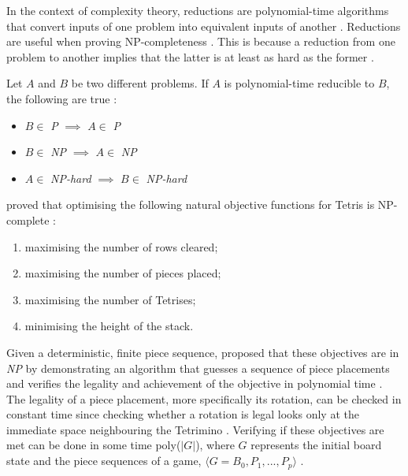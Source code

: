 \documentclass[a4paper, 12pt]{extreport}
\begin{document}
				In the context of complexity theory, reductions are polynomial-time algorithms that convert inputs of one problem into equivalent inputs of another \cite{npcompleteness}. Reductions are useful when proving NP-completeness \cite{cc:modern}. This is because a reduction from one problem to another implies that the latter is at least as hard as the former \cite{cc:modern}.
				
				Let $A$ and $B$ be two different problems. If $A$ is polynomial-time reducible to $B$, the following are true \cite{npcompleteness}:
				
				\begin{itemize}
					\item $B \in $ \textit{P} $\implies$ $A \in $ \textit{P}
					\item $B \in $ \textit{NP} $\implies$ $A \in $ \textit{NP}
					\item $A \in $ \textit{NP-hard} $\implies$ $B \in$ \textit{NP-hard}
				\end{itemize}
				
				\citeauthor{tetris-is-hard-even-to-approx} proved that optimising the following natural objective functions for Tetris is NP-complete \cite{tetris-is-hard-even-to-approx}:
				
				\begin{enumerate}
					\item maximising the number of rows cleared;
					\item maximising the number of pieces placed;
					\item maximising the number of Tetrises;
					\item minimising the height of the stack.
				\end{enumerate}
				
				Given a deterministic, finite piece sequence, \citeauthor{tetris-is-hard-even-to-approx} proposed that these objectives are in \textit{NP} by demonstrating an algorithm that  guesses a sequence of piece placements and verifies the legality and achievement of the objective in polynomial time \cite{tetris-is-hard-even-to-approx}. The legality of a piece placement, more specifically its rotation, can be checked in constant time since checking whether a rotation is legal looks only at the immediate space neighbouring the Tetrimino \cite{tetris-is-hard-even-to-approx}. Verifying if these objectives are met can be done in some time poly($|G|$), where $G$ represents the initial board state and the piece sequences of a game, $\langle G = B_0, P_1, ... , P_p \rangle$ \cite{tetris-is-hard-even-to-approx}.
				
\end{document}
